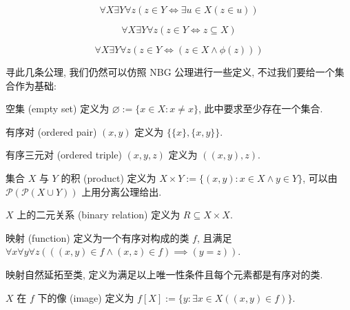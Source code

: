 \begin{axiom}
    \label {axiom:ZF Axiom of Union}
    \[
        \forall X \exists Y \forall z (z \in Y \iff \exists u \in X (z \in u))
    \]
\end{axiom}

\begin{axiom}
    \label {axiom:ZF Axiom of Power Set}
    \[
        \forall X \exists Y \forall z (z \in Y \iff z \subseteq X)
    \]
\end{axiom}

\begin{axiom}
    \label {axiom:ZF Axiom Schema of Separations}
    \[
        \forall X \exists Y \forall z (z \in Y \iff (z \in X \land \phi (z)))
    \]
\end{axiom}

寻此几条公理, 我们仍然可以仿照 NBG 公理进行一些定义, 不过我们要给一个集合作为基础:

\begin{definition}
    \label {definition:ZF empty set}
    空集 (empty set) 定义为 \(\varnothing := \{x \in X : x \neq x\}\), 此中要求至少存在一个集合.

    \label {definition:ZF ordered pair}
    有序对 (ordered pair) \((x,y)\) 定义为 \(\{\{x\},\{x,y\}\}\).

    \label {definition:ZF ordered triple}
    有序三元对 (ordered triple) \((x,y,z)\) 定义为 \(((x,y),z)\).

    \label {definition:ZF set product}
    集合 \(X\) 与 \(Y\) 的积 (product) 定义为 \(X \times Y := \{(x,y) : x \in X \land y \in Y\}\),
    可以由 \(\mathcal{P} (\mathcal{P} (X \cup Y))\) 上用分离公理给出.

    \label {definition:ZF binary relation}
    \(X\) 上的二元关系 (binary relation) 定义为 \(R \subseteq X \times X\).

    \label {definition:ZF function}
    映射 (function) 定义为一个有序对构成的类 \(f\), 且满足
    \(\forall x \forall y \forall z (((x,y) \in f \land (x,z) \in f) \implies (y = z))\).

    映射自然延拓至类, 定义为满足以上唯一性条件且每个元素都是有序对的类.

    \label {definition:ZF image}
    \(X\) 在 \(f\) 下的像 (image) 定义为 \(f[X] := \{y : \exists x \in X ((x,y) \in f)\}\).
\end{definition}

